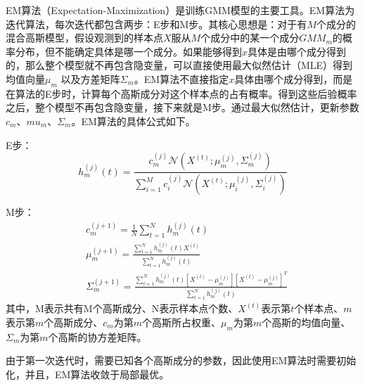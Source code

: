 EM算法（Expectation-Maximization）是训练GMM模型的主要工具。EM算法为迭代算法，每次迭代都包含两步：E步和M步。其核心思想是：对于有$M$个成分的混合高斯模型，假设观测到的样本点$X$服从$M$个成分中的某一个成分$GMM_m$的概率分布，但不能确定具体是哪一个成分。如果能够得到$x$具体是由哪个成分得到的，那么整个模型就不再包含隐变量，可以直接使用最大似然估计（MLE）得到均值向量$\mu_m$ 以及方差矩阵$\Sigma_m$。EM算法不直接指定$x$具体由哪个成分得到，而是在算法的E步时，计算每个高斯成分对这个样本点的占有概率。得到这些后验概率之后，整个模型不再包含隐变量，接下来就是M步。通过最大似然估计，更新参数$c_m$、$mu_m$、$\Sigma_m$。EM算法的具体公式如下。

E步：
\begin{equation}
  h_m^{(j)}(t) = \frac{c_m^{(j)}\mathcal{N}(X^{(t)};\mu_m^{(j)},\Sigma_m^{(j)})}{\sum_{i=1}^M c_i^{(j)}\mathcal{N}(X^{(t)};\mu_i^{(j)},\Sigma_i^{(j)})}
\end{equation}

M步：
\begin{eqnarray}
  &c_m^{(j+1)}=\frac{1}{N}\sum_{t=1}^N h_m^{(j)}(t) \\
  &\mu_m^{(j+1)}=\frac{\sum_{t=1}^{N} h_m^{(j)}(t)X^{(t)}}{\sum_{t=1}^{N} h_m^{(j)}(t)} \\
  &\Sigma_m^{(j+1)}=\frac{\sum_{t=1}^{N} h_m^{(j)}(t)[X^{(t)}-\mu_m^{(j)}][X^{(t)}-\mu_m^{(j)}]^T}{\sum_{t=1}^{N} h_m^{(j)}(t)}
\end{eqnarray}
其中，M表示共有M个高斯成分、N表示样本点个数、$X^{(t)}$表示第$t$个样本点、$m$表示第$m$个高斯成分、$c_m$为第$m$个高斯所占权重、$\mu_m$为第$m$个高斯的均值向量、$\Sigma_m$为第$m$个高斯的协方差矩阵。

由于第一次迭代时，需要已知各个高斯成分的参数，因此使用EM算法时需要初始化，并且，EM算法收敛于局部最优。
